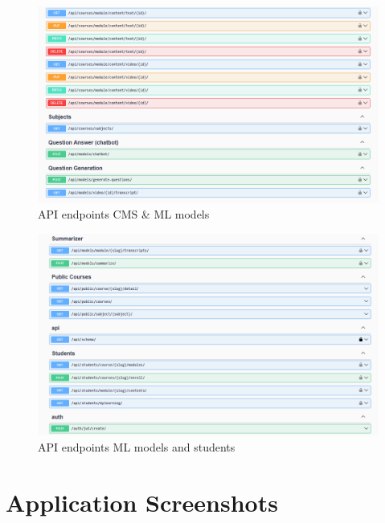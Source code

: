 \begin{figure}[h!]
	\centering
	\includegraphics[max height=\textheight,max width=\textwidth]{figures/swagger3.png}
	\caption{API endpoints CMS \& ML models}
\end{figure}
	
\begin{figure}[h!]
	\centering
	\includegraphics[max height=\textheight,max width=\textwidth]{figures/swagger4.png}
	\caption{API endpoints ML models and students}
\end{figure}

\newpage 

\FloatBarrier
\section{Application Screenshots}

